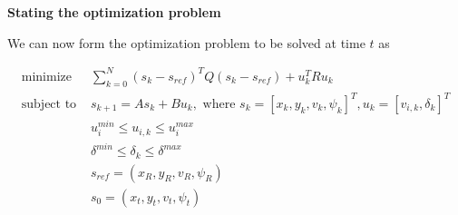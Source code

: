 \textbf{Stating the optimization problem}

We can now form the optimization problem to be solved at time $t$ as

\begin{align}
  \text{minimize }    & \sum\limits_{k=0}^N (s_k - s_{ref})^T Q (s_k - s_{ref}) + u_k^T R u_k \\
  \text{subject to }  & s_{k+1} = A s_k + B u_k, \text{ where } s_k = [x_k, y_k, v_k, \psi_k]^T, u_k = [v_{i,k}, \delta_k]^T \\
                      & u_{i}^{min} \leq u_{i,k} \leq u_{i}^{max} \\
                      & \delta^{min} \leq \delta_k \leq \delta^{max} \\
                      & s_{ref} = (x_R, y_R, v_R, \psi_R) \\
                      & s_0 = (x_t, y_t, v_t, \psi_t)
\end{align}
